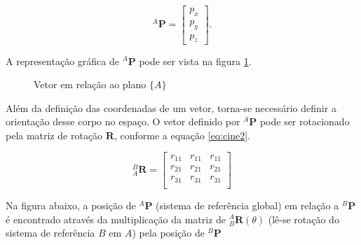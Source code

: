 \begin{equation}\label{eq:cine1}
    {}^A\mathbf{P} = \begin{bmatrix}
    p_x\\ p_y \\ p_z
    \end{bmatrix}.
    \end{equation}
    
    A representação gráfica de ${}^A\mathbf{P}$ pode ser vista na figura \ref{fig:cine1f}. 
    
    \begin{figure}[!ht]
    \centering
    \caption{Vetor em relação ao plano $\{A\}$}
    \label{fig:cine1f}
    \end{figure}
    
    Além da definição das coordenadas de um vetor, torna-se necessário definir a orientação desse corpo no espaço. O vetor definido por ${}^A\mathbf{P}$ pode ser rotacionado pela matriz de rotação $\mathbf{R}$, conforme a equação \eqref{eq:cine2}.
    
    \begin{equation}\label{eq:cine2}
    {}_A^B
    \mathbf{R} = 
    \begin{bmatrix}
    r_{11} & r_{11} & r_{11}\\
    r_{21} & r_{21} & r_{21}\\
    r_{31} & r_{31} & r_{31}\\
    \end{bmatrix}
    \end{equation}


    Na figura abaixo, a posição de ${}^A\mathbf{P}$ (sistema de referência global) em relação a ${}^B\mathbf{P}$ é encontrado através da multiplicação da matriz de ${}_B^A \mathbf{R}(\theta)$ (lê-se rotação do sistema de referência $B$ em $A$) pela posição de ${}^B\mathbf{P}$

